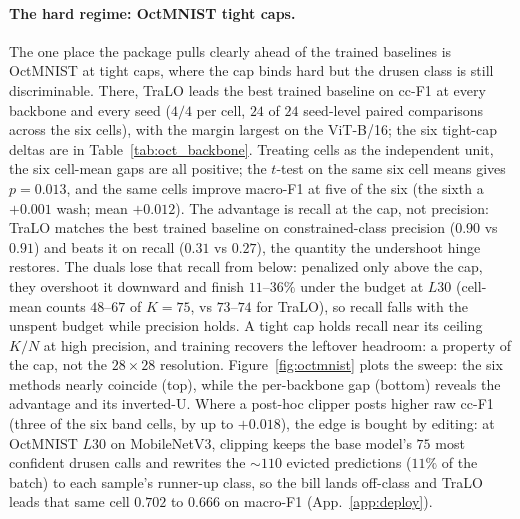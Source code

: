 \documentclass[10pt]{article}
\begin{document}
\paragraph{The hard regime: OctMNIST tight caps.}
The one place the package pulls clearly ahead of the trained baselines is
OctMNIST at tight caps, where the cap binds hard but the drusen class is
still discriminable. There, TraLO leads the best trained baseline on cc-F1
at every backbone and every seed ($4/4$ per cell, $24$ of $24$ seed-level
paired comparisons across the six cells), with the margin largest on the
ViT-B/16; the six tight-cap deltas are in Table~\ref{tab:oct_backbone}.
Treating cells as the independent unit, the six cell-mean gaps are all
positive; the $t$-test on the same six cell means gives $p{=}0.013$, and
the same cells improve macro-F1 at five of the six (the sixth a $+0.001$
wash; mean $+0.012$). The advantage is recall at the cap, not precision:
TraLO matches the best trained baseline on constrained-class precision
($0.90$ vs $0.91$) and beats it on recall ($0.31$ vs $0.27$), the quantity
the undershoot hinge restores. The duals lose that recall from below:
penalized only above the cap, they overshoot it downward and finish
$11$--$36\%$ under the budget at $L30$ (cell-mean counts $48$--$67$ of
$K{=}75$, vs $73$--$74$ for TraLO), so recall falls with the unspent
budget while precision holds. A tight cap holds recall near its ceiling
$K/N$ at high precision, and training recovers the leftover headroom: a
property of the cap, not the $28{\times}28$ resolution. Figure~\ref{fig:octmnist}
plots the sweep: the six methods nearly coincide (top), while the
per-backbone gap (bottom) reveals the advantage and its inverted-U. Where a
post-hoc clipper posts higher raw cc-F1 (three of the six band cells, by
up to $+0.018$), the edge is bought by editing: at OctMNIST $L30$ on
MobileNetV3, clipping keeps the base model's $75$ most confident drusen
calls and rewrites the ${\sim}110$ evicted predictions ($11\%$ of the
batch) to each sample's runner-up class, so the bill lands off-class and
TraLO leads that same cell $0.702$ to $0.666$ on macro-F1
(App.~\ref{app:deploy}).
\end{document}
